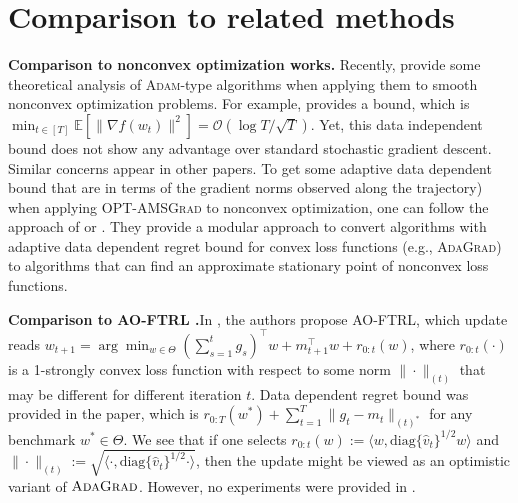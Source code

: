 \documentclass[twoside]{article}
\begin{document}
\vspace{-0.1in}
\section{Comparison to related methods} \label{sec:related}
\vspace{-0.05in}

\textbf{Comparison to nonconvex optimization works.}\hspace{0.1in}
Recently, \citep{ZRSKK18,CLSH19,WWB18,ZTYCG18,ZS18,LO18} provide some theoretical analysis of \textsc{Adam}-type algorithms when applying them to smooth nonconvex optimization problems. 
For example, \citep{CLSH19} provides a bound, which is $\min_{t \in [T]} \mathbb{E}[\| \nabla f(w_t) \|^2 ] = \mathcal{O}(\log T / \sqrt{T}) $.
Yet, this data independent bound does not show any advantage over standard stochastic gradient descent. Similar concerns appear in other papers.
To get some adaptive data dependent bound that are in terms of the gradient norms observed along the trajectory) when applying  \textsc{OPT-AMSGrad} to nonconvex optimization, one can follow the approach of \citep{Princeton18} or \citep{CYYZC19}.
They provide a modular approach to convert algorithms with adaptive data dependent regret bound for convex loss functions (e.g., \textsc{AdaGrad}) to algorithms that can find an approximate stationary point of nonconvex loss functions. 

\textbf{Comparison to AO-FTRL \citep{MY16}.}\hspace{0.1in}In \citep{MY16}, the authors propose AO-FTRL, which update reads $w_{t+1} = \arg\min_{{w \in \Theta}} ( \sum_{s=1}^t g_s )^{\top}  w + m_{t+1}^\top w + r_{0:t}(w) $, where $r_{0:t}(\cdot)$ is a 1-strongly convex loss function with respect to some norm $\| \cdot\|_{(t)}$ that may be different for different iteration $t$. 
Data dependent regret bound was provided in the paper, which is $r_{{0:T}}(w^*) + \sum_{t=1}^T \| g_t - m_t \|_{(t)^*}$ for any benchmark $w^{*} \in \Theta$. We see that if one selects $r_{0:t}(w) := \langle w, \text{diag}\{\hat{v}_t\}^{1/2} w \rangle$  and $\| \cdot \|_{(t)}:=  \sqrt{ \langle \cdot, \text{diag}\{\hat{v}_t\}^{1/2} \cdot \rangle }$, then the update might be viewed as an optimistic variant of $\textsc{AdaGrad}$. However, no experiments were provided in \citep{MY16}. 
\end{document}
